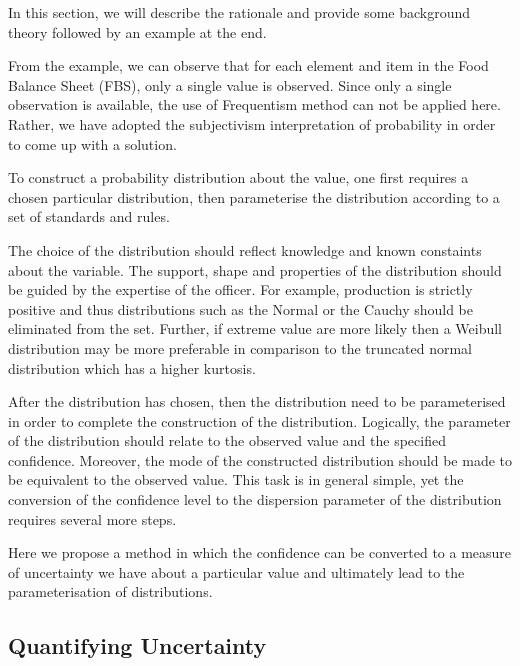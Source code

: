\documentclass[nojss]{jss}\usepackage[]{graphicx}\usepackage[]{color}
\begin{document}
In this section, we will describe the rationale and provide some
background theory followed by an example at the end.

From the example, we can observe that for each element and item in the
Food Balance Sheet (FBS), only a single value is observed. Since only
a single observation is available, the use of Frequentism method can
not be applied here. Rather, we have adopted the subjectivism
interpretation of probability in order to come up with a solution.


To construct a probability distribution about the value, one
first requires a chosen particular distribution, then parameterise the
distribution according to a set of standards and rules.

The choice of the distribution should reflect knowledge and known
constaints about the variable. The support, shape and properties of
the distribution should be guided by the expertise of the officer. For
example, production is strictly positive and thus distributions such
as the Normal or the Cauchy should be eliminated from the
set. Further, if extreme value are more likely then a Weibull
distribution may be more preferable in comparison to the truncated
normal distribution which has a higher kurtosis. 

After the distribution has chosen, then the distribution need to be
parameterised in order to complete the construction of the
distribution. Logically, the parameter of the distribution should
relate to the observed value and the specified confidence. Moreover,
the mode of the constructed distribution should be made to be
equivalent to the observed value. This task is in general simple, yet
the conversion of the confidence level to the dispersion parameter of
the distribution requires several more steps. 

Here we propose a method in which the confidence can be converted to a
measure of uncertainty we have about a particular value and ultimately
lead to the parameterisation of distributions.


\subsection{Quantifying Uncertainty}
\end{document}
